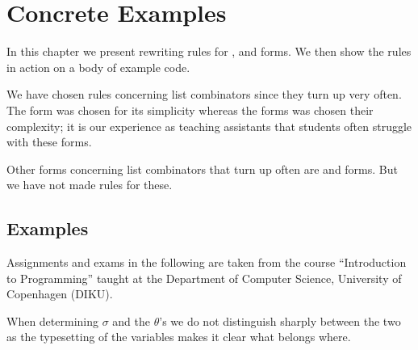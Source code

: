 \chapter{Concrete Examples}
In this chapter we present rewriting rules for ,  and
 forms. We then show the rules in action on a body of example code.

We have chosen rules concerning list combinators since they turn up very
often. The  form was chosen for its simplicity whereas the
 forms was chosen their complexity; it is our experience as
teaching assistants that students often struggle with these forms.

Other forms concerning list combinators that turn up often are  and
 forms. But we have not made rules for these.



\section{Examples}
Assignments and exams in the following are taken from the course ``Introduction
to Programming'' taught at the Department of Computer Science, University of
Copenhagen (DIKU).

When determining $\sigma$ and the $\theta$'s we do not distinguish sharply
between the two as the typesetting of the variables makes it clear what belongs
where.





